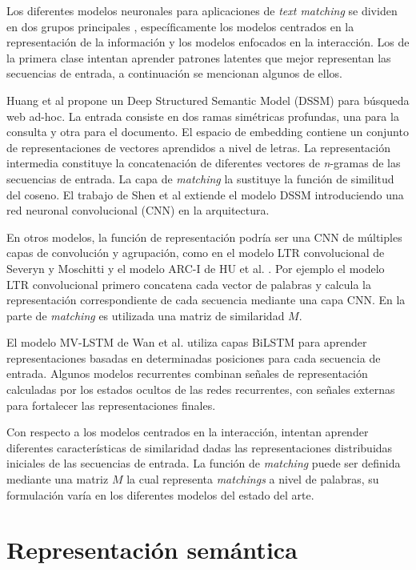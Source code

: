 \documentclass{llncs}
\begin{document}
Los diferentes modelos neuronales para aplicaciones de \textit{text matching} se dividen en dos grupos principales \cite{178}, específicamente los modelos centrados en la representación de la información y los modelos enfocados en la interacción. Los de la primera clase intentan aprender patrones latentes que mejor representan las secuencias de entrada, a continuación se mencionan algunos de ellos.

Huang et al \cite{16} propone un Deep Structured Semantic Model (DSSM) para búsqueda web ad-hoc. La entrada consiste en dos ramas simétricas profundas, una para la consulta y otra para el documento. El espacio de embedding contiene un conjunto de representaciones de vectores aprendidos a nivel de letras. La representación intermedia constituye la concatenación de diferentes vectores de \textit{n}-gramas de las secuencias de entrada. La capa de \textit{matching} la sustituye la función de similitud del coseno. El trabajo de Shen et al \cite{237} extiende el modelo DSSM introduciendo una red neuronal convolucional (CNN) en la arquitectura.

En otros modelos, la función de representación podría ser una CNN de múltiples capas de convolución y agrupación, como en el modelo LTR convolucional de Severyn y Moschitti \cite{238} y el modelo ARC-I de HU et al. \cite{17}. Por ejemplo el modelo LTR convolucional \cite{238} primero concatena cada vector de palabras y calcula la representación correspondiente de cada secuencia mediante una capa CNN. En la parte de \textit{matching} es utilizada una matriz de similaridad $M$.

El modelo MV-LSTM de Wan et al. \cite{3} utiliza capas BiLSTM para aprender representaciones basadas en determinadas posiciones para cada secuencia de entrada. Algunos modelos recurrentes \cite{243,241} combinan señales de representación calculadas por los estados ocultos de las redes recurrentes, con señales externas para fortalecer las representaciones finales.

Con respecto a los modelos centrados en la interacción, intentan aprender diferentes características de similaridad dadas las representaciones distribuidas iniciales de las secuencias de entrada. La función de \textit{matching} puede ser definida mediante una matriz $M$ la cual representa \textit{matchings} a nivel de palabras, su formulación varía en los diferentes modelos del estado del arte. 

\section{Representación semántica}
\end{document}
